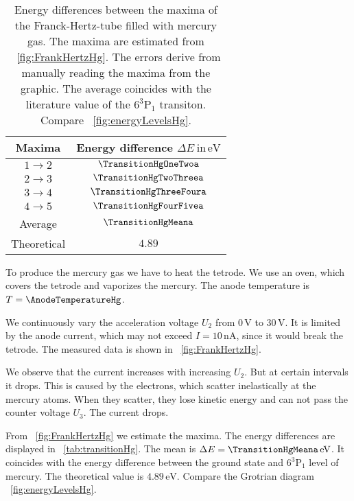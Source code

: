 \documentclass[a4paper,10pt,twocolumn]{article}
\newcommand{\volt}{\, \mathrm{V}}
\newcommand{\eV}{\, \mathrm{eV}}
\newcommand{\HgLevelA}{6^3\mathrm{P}_1}
\newcommand{\TheoreticalTransitionHga}{4.89}
\begin{document}
    \begin{table}[httb]
        \centering
        \begin{tabular}{c c}
            \hline \hline 
            Maxima & Energy difference $\Delta E \ \mathrm{in} \eV$ \\
            \hline
            $1 \rightarrow 2$ & $\TransitionHgOneTwoa$ \\
            $2 \rightarrow 3$ & $\TransitionHgTwoThreea$ \\
            $3 \rightarrow 4$ & $\TransitionHgThreeFoura$\\
            $4 \rightarrow 5$ & $\TransitionHgFourFivea$\\
            \hline
            Average & $\TransitionHgMeana$\\
            Theoretical & $\TheoreticalTransitionHga$ \\
            \hline 
            \hline
        \end{tabular}
        \caption{Energy differences between the maxima of the Franck-Hertz-tube filled with mercury gas.
        The maxima are estimated from ~\autoref{fig:FrankHertzHg}.
        The errors derive from manually reading the maxima from the graphic.
        The average coincides with the literature value of the $\HgLevelA$ transiton.
        Compare ~\autoref{fig:energyLevelsHg}.}
        \label{tab:transitionHg}
    \end{table}
    
    To produce the mercury gas we have to heat the tetrode.
    We use an oven, which covers the tetrode and vaporizes the mercury.
    The anode temperature is $T = \AnodeTemperatureHg$.
    
    We continuously vary the acceleration voltage $U_2$ from $0\volt$ to $30\volt$.
    It is limited by the anode current, which 
    may not exceed $I = 10 \, \mathrm{nA}$, since it would break the tetrode.
    The measured data is shown in ~\autoref{fig:FrankHertzHg}.
    
    We observe that the current increases with increasing $U_2$.
    But at certain intervals it drops.
    This is caused by the electrons, which scatter inelastically at the mercury atoms.
    When they scatter, they lose kinetic energy and can not pass the counter voltage $U_3$.
    The current drops.
    
    From ~\autoref{fig:FrankHertzHg} we estimate the maxima.
    The energy differences are displayed in ~\autoref{tab:transitionHg}.
    The mean is $\Delta E = \TransitionHgMeana \eV$.
    It coincides with the energy difference between the ground state and $\HgLevelA$ level
    of mercury.
    The theoretical value is $\TheoreticalTransitionHga \eV$.
    Compare the Grotrian diagram ~\autoref{fig:energyLevelsHg}.
    
\end{document}
